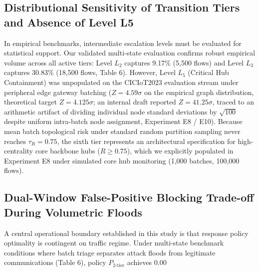 \documentclass[journal,10pt,onecolumn]{IEEEtran}
\begin{document}
\subsection{Distributional Sensitivity of Transition Tiers and Absence of Level L5}
In empirical benchmarks, intermediate escalation levels must be evaluated for statistical support. Our validated multi-state evaluation confirms robust empirical volume across all active tiers: Level $L_2$ captures 9.17\% (5,500 flows) and Level $L_3$ captures 30.83\% (18,500 flows, Table 6). However, Level $L_5$ (Critical Hub Containment) was unpopulated on the CICIoT2023 evaluation stream under peripheral edge gateway batching ($Z = 4.59\sigma$ on the empirical graph distribution, theoretical target $Z = 4.125\sigma$; an internal draft reported $Z = 41.25\sigma$, traced to an arithmetic artifact of dividing individual node standard deviations by $\sqrt{100}$ despite uniform intra-batch node assignment, Experiment E8 / E10). Because mean batch topological risk under standard random partition sampling never reaches $\tau_R = 0.75$, the sixth tier represents an architectural specification for high-centrality core backbone hubs ($R \ge 0.75$), which we explicitly populated in Experiment E8 under simulated core hub monitoring (1,000 batches, 100,000 flows).


\subsection{Dual-Window False-Positive Blocking Trade-off During Volumetric Floods}
A central operational boundary established in this study is that response policy optimality is contingent on traffic regime. Under multi-state benchmark conditions where batch triage separates attack floods from legitimate communications (Table 6), policy $P_{2\text{-tier}}$ achieves 0.00%
\end{document}
